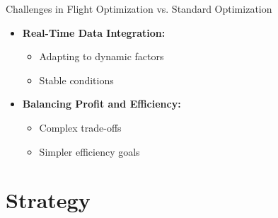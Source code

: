\documentclass[aspectratio=169,xcolor=dvipsnames]{beamer}
\begin{document}
\begin{frame}{Challenges in Flight Optimization vs. Standard Optimization}
\begin{minipage}{0.5\textwidth}
\begin{itemize}
            \item \textbf{Real-Time Data Integration:}
            \begin{itemize}
                \item Adapting to dynamic factors
                \item Stable conditions
            \end{itemize}
            
            \item \textbf{Balancing Profit and Efficiency:}
            \begin{itemize}
                \item Complex trade-offs
                \item Simpler efficiency goals
            \end{itemize}
        \end{itemize}
    \end{minipage}
    \end{frame}

\section{Strategy}
\end{document}
